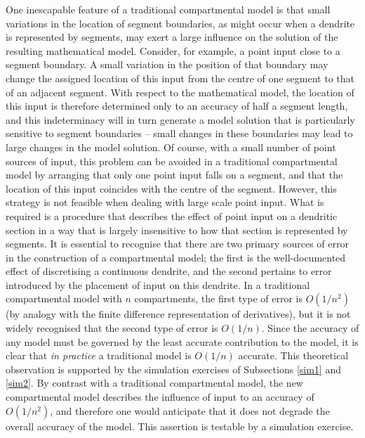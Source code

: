 One inescapable feature of a traditional compartmental model is
that small variations in the location of segment boundaries, as
might occur when a dendrite is represented by segments, may exert
a large influence on the solution of the resulting mathematical
model. Consider, for example, a point input close to a segment
boundary. A small variation in the position of that boundary may
change the assigned location of this input from the centre of one
segment to that of an adjacent segment. With respect to the
mathematical model, the location of this input is therefore
determined only to an accuracy of half a segment length, and this
indeterminacy will in turn generate a model solution that is
particularly sensitive to segment boundaries -- small changes in
these boundaries may lead to large changes in the model solution.
Of course, with a small number of point sources of input, this
problem can be avoided in a traditional compartmental model by
arranging that only one point input falls on a segment, and that
the location of this input coincides with the centre of the
segment. However, this strategy is not feasible when dealing with
large scale point input. What is required is a procedure that
describes the effect of point input on a dendritic section in a
way that is largely insensitive to how that section is represented
by segments. It is essential to recognise that there are two
primary sources of error in the construction of a compartmental
model; the first is the well-documented effect of discretising a
continuous dendrite, and the second pertains to error introduced
by the placement of input on this dendrite. In a traditional
compartmental model with $n$ compartments, the first type of error
is $O(1/n^2)$ (by analogy with the finite difference
representation of derivatives), but it is not widely recognised
that the second type of error is $O(1/n)$. Since the accuracy of
any model must be governed by the least accurate contribution to
the model, it is clear that \emph{in practice} a traditional model
is $O(1/n)$ accurate. This theoretical observation is supported by
the simulation exercises of Subsections \ref{sim1} and \ref{sim2}.
By contrast with a traditional compartmental model, the new
compartmental model describes the influence of input to an
accuracy of $O(1/n^2)$, and therefore one would anticipate that it
does not degrade the overall accuracy of the model. This assertion
is testable by a simulation exercise.

